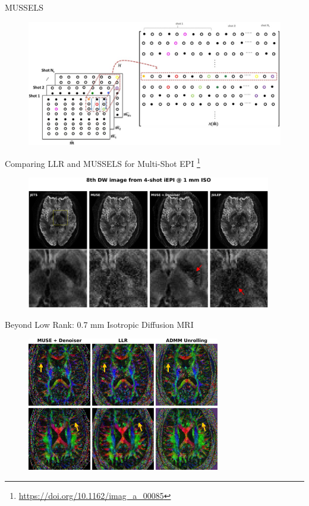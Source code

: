 \documentclass[aspectratio=169]{beamer}
\begin{document}
	\begin{frame}{MUSSELS}
		\begin{figure}
			\centering
			\includegraphics[width=\textwidth]{figures/mrm26382-fig-0002-m.jpg}
		\end{figure}
	\end{frame}
	
	\begin{frame}{Comparing LLR and MUSSELS for Multi-Shot EPI \footnote{\url{https://doi.org/10.1162/imag_a_00085}}}
		\begin{figure}
			\centering
			\includegraphics[width=0.95\textwidth]{figures/imag_a_00085_fig4.png}
		\end{figure}
	\end{frame}
	
	\begin{frame}{Beyond Low Rank: 0.7 mm Isotropic Diffusion MRI}
		\begin{figure}
			\centering
			\includegraphics[width=0.75\textwidth]{figures/deepdwi_fig8.png}
		\end{figure}
	\end{frame}
	
\end{document}
